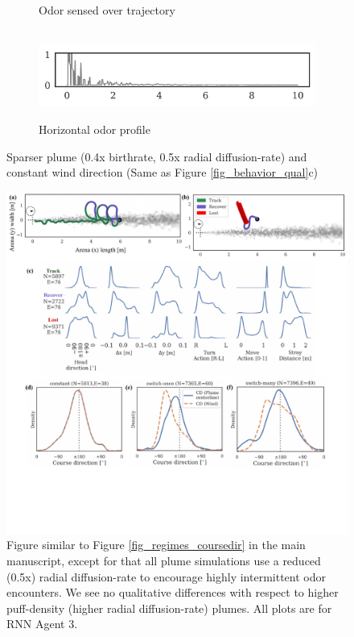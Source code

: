 \documentclass[5p,twocolumn,authoryear]{elsarticle}
\begin{document}
\begin{figure}[h!]
\begin{subfigure}{0.40\textwidth}
    \caption{Odor sensed over trajectory} \\
    \includegraphics[width=\textwidth]{output_16_25.png}
    \caption{Horizontal odor profile}
\end{subfigure}%
\caption{Sparser plume (0.4x birthrate, 0.5x radial diffusion-rate) and constant wind direction (Same as Figure \ref{fig_behavior_qual}c) 
}
\end{figure}


\begin{figure}[h!]
\centering
\includegraphics[width=0.99\linewidth]{fig_regimes_coursedir_d50.pdf}
\caption{Figure similar to Figure \ref{fig_regimes_coursedir} in the main manuscript, except for that all plume simulations use a reduced (0.5x) radial diffusion-rate to encourage highly intermittent odor encounters. 
We see no qualitative differences with respect to higher puff-density (higher radial diffusion-rate) plumes.
All plots are for RNN Agent 3.
}
\end{figure}
\end{document}
